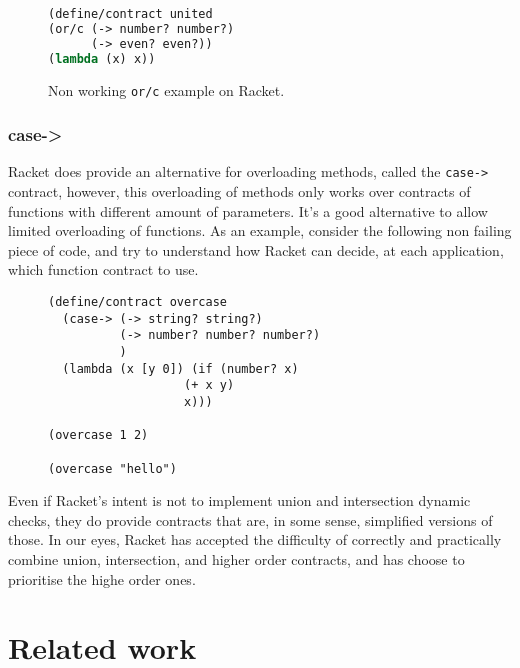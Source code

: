 \documentclass[sigplan,10pt,review,anonymous]{acmart}
\newcommand{\unsure}[2][1=]{}
\newcommand{\info}[2][1=]{}
\newcommand{\racket}[1]{\lstinline[language=racket]{#1}}
\begin{document}
\begin{figure}[h]

\begin{lstlisting}[language=lisp]
(define/contract united
(or/c (-> number? number?)
      (-> even? even?))
(lambda (x) x))
\end{lstlisting}
\caption{Non working \racket{or/c} example on Racket.}
\label{code:racket:or/c:non-working}

\end{figure}


\unsure{This section is overall a bit hard to follow. I
  think I've figured out what it means, but it needs more love. Also
  give an example which doesn't work and one that does for or/c.}

\subsubsection{case->}

Racket does provide an alternative for overloading methods, called the
\racket{case->} contract, however, this overloading of methods only
works over contracts of functions with different amount of parameters.
It's a good alternative to allow limited overloading of functions.
As an example, consider the following non failing piece of code, and
try to understand how Racket can decide, at each application,
which function contract to use.

\begin{figure}[h]

\begin{lstlisting}[language=racket]
(define/contract overcase
  (case-> (-> string? string?)
          (-> number? number? number?)
          )
  (lambda (x [y 0]) (if (number? x)
                   (+ x y)
                   x)))

(overcase 1 2)

(overcase "hello")
\end{lstlisting}
\end{figure}

Even if Racket's intent is not to implement union and intersection
dynamic checks, they do provide contracts that are, in some sense,
simplified versions of those.
In our eyes, Racket has accepted the difficulty of correctly and practically
combine union, intersection, and higher order contracts, and has choose
to prioritise the highe order ones.



\section{Related work}
\label{sec:related-work}
\info{Including a mention of statically typed systems with union}
\end{document}
